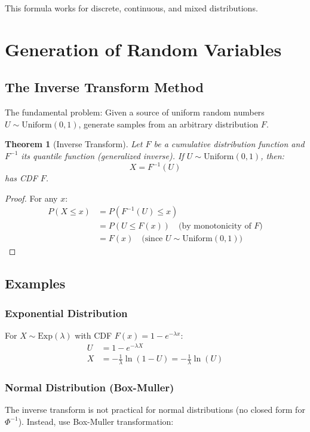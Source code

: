 \documentclass[12pt,a4paper]{article}
\newtheorem{theorem}{Theorem}
\begin{document}
This formula works for discrete, continuous, and mixed distributions.

\section{Generation of Random Variables}

\subsection{The Inverse Transform Method}

The fundamental problem: Given a source of uniform random numbers $U \sim \text{Uniform}(0,1)$, generate samples from an arbitrary distribution $F$.

\begin{theorem}[Inverse Transform]
Let $F$ be a cumulative distribution function and $F^{-1}$ its quantile function (generalized inverse). If $U \sim \text{Uniform}(0,1)$, then:
\begin{equation}
X = F^{-1}(U)
\end{equation}
has CDF $F$.
\end{theorem}

\begin{proof}
For any $x$:
\begin{align*}
P(X \leq x) &= P(F^{-1}(U) \leq x) \\
&= P(U \leq F(x)) \quad \text{(by monotonicity of $F$)} \\
&= F(x) \quad \text{(since $U \sim \text{Uniform}(0,1)$)}
\end{align*}
\end{proof}

\subsection{Examples}

\subsubsection{Exponential Distribution}
For $X \sim \text{Exp}(\lambda)$ with CDF $F(x) = 1 - e^{-\lambda x}$:
\begin{align*}
U &= 1 - e^{-\lambda X} \\
X &= -\frac{1}{\lambda}\ln(1-U) = -\frac{1}{\lambda}\ln(U)
\end{align*}

\subsubsection{Normal Distribution (Box-Muller)}
The inverse transform is not practical for normal distributions (no closed form for $\Phi^{-1}$). Instead, use Box-Muller transformation:
\end{document}
